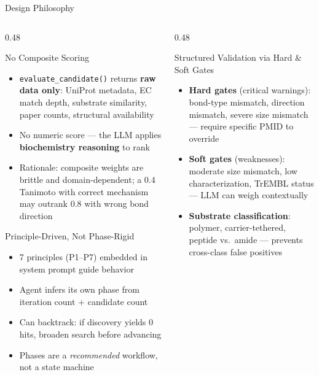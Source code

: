\documentclass[aspectratio=169, 11pt]{beamer}
\begin{document}
\begin{frame}{Design Philosophy}
\vspace{-8pt}
\begin{columns}[T]
\begin{column}{0.48\textwidth}

\begin{alertblock}{\small No Composite Scoring}
\vspace{-2pt}
\begin{itemize}\scriptsize
\setlength\itemsep{1pt}
\item \texttt{evaluate\_candidate()} returns \textbf{raw data only}: UniProt metadata, EC match depth, substrate similarity, paper counts, structural availability
\item No numeric score --- the LLM applies \textbf{biochemistry reasoning} to rank
\item Rationale: composite weights are brittle and domain-dependent; a 0.4 Tanimoto with correct mechanism may outrank 0.8 with wrong bond direction
\end{itemize}
\end{alertblock}

\begin{block}{\small Principle-Driven, Not Phase-Rigid}
\vspace{-2pt}
\begin{itemize}\scriptsize
\setlength\itemsep{1pt}
\item 7 principles (P1--P7) embedded in system prompt guide behavior
\item Agent infers its own phase from iteration count + candidate count
\item Can backtrack: if discovery yields 0 hits, broaden search before advancing
\item Phases are a \textit{recommended} workflow, not a state machine
\end{itemize}
\end{block}

\end{column}
\begin{column}{0.48\textwidth}

\begin{exampleblock}{\small Structured Validation via Hard \& Soft Gates}
\vspace{-2pt}
\begin{itemize}\scriptsize
\setlength\itemsep{1pt}
\item \textbf{Hard gates} (critical warnings): bond-type mismatch, direction mismatch, severe size mismatch --- require specific PMID to override
\item \textbf{Soft gates} (weaknesses): moderate size mismatch, low characterization, TrEMBL status --- LLM can weigh contextually
\item \textbf{Substrate classification}: polymer, carrier-tethered, peptide vs.\ amide --- prevents cross-class false positives
\end{itemize}
\end{exampleblock}


\end{column}
\end{columns}
\end{frame}
\end{document}
